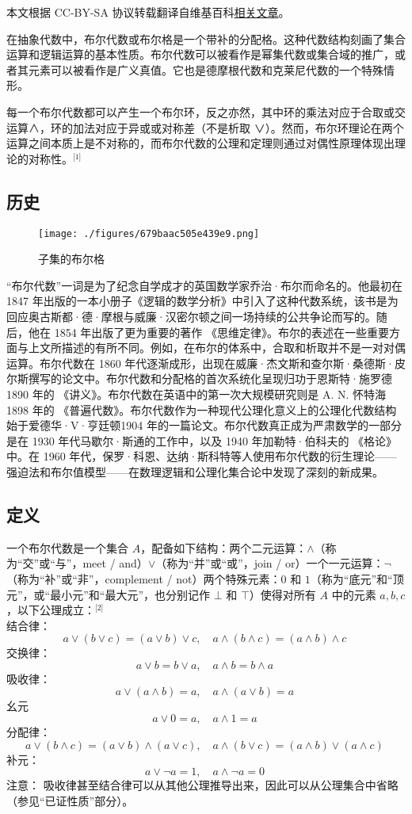 
本文根据 CC-BY-SA 协议转载翻译自维基百科\href{https://en.wikipedia.org/wiki/Boolean_algebra_(structure)}{相关文章}。

在抽象代数中，布尔代数或布尔格是一个带补的分配格。这种代数结构刻画了集合运算和逻辑运算的基本性质。布尔代数可以被看作是幂集代数或集合域的推广，或者其元素可以被看作是广义真值。它也是德摩根代数和克莱尼代数的一个特殊情形。

每一个布尔代数都可以产生一个布尔环，反之亦然，其中环的乘法对应于合取或交运算∧，环的加法对应于异或或对称差（不是析取 ∨）。然而，布尔环理论在两个运算之间本质上是不对称的，而布尔代数的公理和定理则通过对偶性原理体现出理论的对称性。\(^\text{[1]}\)
\subsection{历史}
\begin{figure}[ht]
\centering
\texttt{[image: ./figures/679baac505e439e9.png]}
\caption{子集的布尔格} \label{fig_BRds_1}
\end{figure}
“布尔代数”一词是为了纪念自学成才的英国数学家乔治·布尔而命名的。他最初在 1847 年出版的一本小册子《逻辑的数学分析》中引入了这种代数系统，该书是为回应奥古斯都·德·摩根与威廉·汉密尔顿之间一场持续的公共争论而写的。随后，他在 1854 年出版了更为重要的著作 《思维定律》。布尔的表述在一些重要方面与上文所描述的有所不同。例如，在布尔的体系中，合取和析取并不是一对对偶运算。布尔代数在 1860 年代逐渐成形，出现在威廉·杰文斯和查尔斯·桑德斯·皮尔斯撰写的论文中。布尔代数和分配格的首次系统化呈现归功于恩斯特·施罗德1890 年的 《讲义》。布尔代数在英语中的第一次大规模研究则是 A. N. 怀特海1898 年的 《普遍代数》。布尔代数作为一种现代公理化意义上的公理化代数结构始于爱德华·V·亨廷顿1904 年的一篇论文。布尔代数真正成为严肃数学的一部分是在 1930 年代马歇尔·斯通的工作中，以及 1940 年加勒特·伯科夫的 《格论》 中。在 1960 年代，保罗·科恩、达纳·斯科特等人使用布尔代数的衍生理论——强迫法和布尔值模型——在数理逻辑和公理化集合论中发现了深刻的新成果。
\subsection{定义}
一个布尔代数是一个集合 $A$，配备如下结构：两个二元运算：$\land$（称为“交”或“与”，meet / and）$\lor$（称为“并”或“或”，join / or）一个一元运算：$\lnot$（称为“补”或“非”，complement / not）两个特殊元素：$0$ 和 $1$（称为“底元”和“顶元”，或“最小元”和“最大元”，也分别记作 $\bot$ 和 $\top$）使得对所有 $A$ 中的元素 $a, b, c$，以下公理成立：\(^\text{[2]}\)\\
结合律：
   $$
   a \lor (b \lor c) = (a \lor b) \lor c, \quad  
   a \land (b \land c) = (a \land b) \land c~
   $$
交换律：
   $$
   a \lor b = b \lor a, \quad  
   a \land b = b \land a~
   $$
吸收律：
   $$
   a \lor (a \land b) = a, \quad  
   a \land (a \lor b) = a~
   $$
幺元
   $$
   a \lor 0 = a, \quad  
   a \land 1 = a~
   $$
分配律：
   $$
   a \lor (b \land c) = (a \lor b) \land (a \lor c), \quad  
   a \land (b \lor c) = (a \land b) \lor (a \land c)~
   $$
补元：
   $$
   a \lor \lnot a = 1, \quad  
   a \land \lnot a = 0~
   $$
注意： 吸收律甚至结合律可以从其他公理推导出来，因此可以从公理集合中省略（参见“已证性质”部分）。

